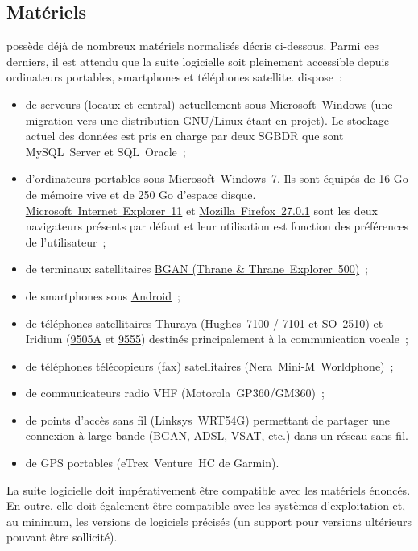 \subsection{Matériels}
\mo possède déjà de nombreux matériels normalisés décris ci-dessous. Parmi ces derniers, il est attendu que la suite logicielle soit pleinement accessible depuis ordinateurs portables, smartphones et téléphones satellite. \mo dispose~:
\begin{itemize}
	\item de serveurs (locaux et central) actuellement sous Microsoft~Windows (une migration vers une distribution GNU/Linux étant en projet). Le stockage actuel des données est pris en charge par deux SGBDR que sont MySQL~Server et SQL~Oracle~;
	\item d'ordinateurs portables sous Microsoft~Windows~7. Ils sont équipés de 16 Go de mémoire vive et de 250 Go d'espace disque. \href{https://www.microsoft.com/fr-fr/download/internet-explorer.aspx}{Microsoft~Internet~Explorer~11} et \href{http://www.mozilla.org/en-US/firefox/27.0.1/releasenotes/}{Mozilla~Firefox~27.0.1} sont les deux navigateurs présents par défaut et leur utilisation est fonction des préférences de l'utilisateur~;
	\item de terminaux satellitaires \href{http://explorersatellite.com/BGAN/thrane_thrane_bgan.html}{BGAN (Thrane \& Thrane~Explorer~500)}~;
	\item de smartphones sous \href{http://www.android.com/}{Android}~;
	\item de téléphones satellitaires Thuraya (\href{http://www.thuraya.com.kw/hughes7101.html}{Hughes~7100} / \href{http://www.thuraya.com.kw/hughes7100.html}{7101} et \href{http://www.thuraya.com.kw/so-2510.html}{SO~2510}) et Iridium (\href{http://www.iridium.com/products/Iridium-9505A-Satellite-Phone.aspx}{9505A} et \href{http://www.iridium.com/products/Iridium9555SatellitePhone.aspx}{9555}) destinés principalement à la communication vocale~;
	\item de téléphones télécopieurs (fax) satellitaires (Nera~Mini-M~Worldphone)~;
	\item de communicateurs radio VHF (Motorola~GP360/GM360)~;
	\item de points d'accès sans fil (Linksys~WRT54G) permettant de partager une connexion à large bande (BGAN, ADSL, VSAT, etc.) dans un réseau sans fil.
	\item de GPS portables (eTrex~Venture~HC de Garmin).
\end{itemize}
\begin{constraint}
La suite logicielle doit impérativement être compatible avec les matériels énoncés. En outre, elle doit également être compatible avec les systèmes d'exploitation et, au minimum, les versions de logiciels précisés (un support pour versions ultérieurs pouvant être sollicité).
\end{constraint}
